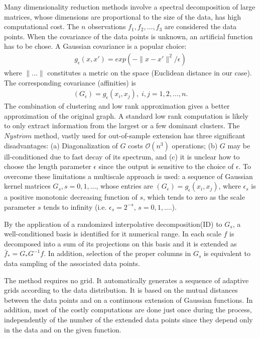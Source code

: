 \documentclass[12pt,letterpaper]{article}
\begin{document}
Many dimensionality reduction methods involve a spectral decomposition of large matrices, whose dimensions are proportional to the size of the data, has high computational cost. The $n$ observations
${f_1,f_2,\dots, f_3}$ are considered the data points.
When the covariance of the data points is unknown, an artificial function has to be chose. A Gaussian covariance is a popular choice:
\begin{align}
g_{\epsilon}(x,x') = exp(- \parallel x-x' \parallel ^ 2 / \epsilon)
\end{align}
where $\parallel\dots\parallel$ constitutes a metric on the space (Euclidean distance in our case). The corresponding covariance (affinities) is
\begin{align}
(G_{\epsilon})=g_{\epsilon}(x_i,x_j), \; i,j=1,2,\dots,n.
\end{align}
The combination of clustering and low rank approximation gives a better approximation of the original graph. A standard low rank computation is likely to only extract information from the
largest or a few dominant clusters. 
The $Nystr\ddot{o}m$ method, vastly used for out-of-sample extension has three significant disadvantages: (a) Diagonalization of $G$ costs $\mathcal{O}(n^3)$ operations; (b) $G$ may be 
ill-conditioned due to fast decay of its spectrum, and (c) it is unclear how to choose the length parameter $\epsilon$ since the output is sensitive to the choice of $\epsilon$.
To overcome these limitations a multiscale approach is used: a sequence of Gaussian kernel matrices $G_s, s=0,1, \dots$, whose entries are $(G_{\epsilon})=g_{\epsilon}(x_i,x_j)$, where 
$\epsilon_s$ is a positive monotonic decreasing function of $s$, which tends to zero as the scale parameter $s$ tends to infinity (i.e. $\epsilon_s=2^{-s}$, $s=0,1,\dots$.). 

By the application of a randomized interpolative decomposition(ID) to $G_s$, a well-conditioned basis is identified for it numerical range. In each scale $f$ is decomposed into a sum of its 
projections on this basis and it is extended as $\bar{f}_{*} = G_{*}G^{-1}f$. In addition, selection of the proper columns in $G_s$ is equivalent to data sampling of the associated data points.

The method requires no grid. It automatically generates a sequence of adaptive grids according to the data distribution. It is based on the mutual distances between the data points and on a continuous 
extension of Gaussian functions. In addition, most of the costly computations are done just once during the process, independently of the number of the extended data points since they depend only in the data and on the given function. 
 
\end{document}
